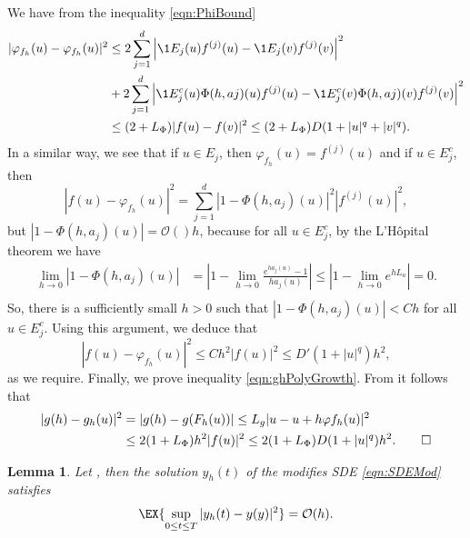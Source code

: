 \documentclass[sort&compress, preprint]{elsarticle}
\theoremstyle{definition}
\theoremstyle{plain}%
\newtheorem{lem}{Lemma}[section]
\theoremstyle{remark}
\begin{document}
\begin{pf}
	We have from the inequality \eqref{eqn:PhiBound}
	\begin{align*}
		|\varphi_{f_h}(u) - \varphi_{f_h}(u)|^2
		&\leq
			2 \sum_{j=1}^d
				\left|
					\1{E_j}(u) f^{(j)}(u)
					-\1{E_j}(v) f^{(j)}(v)
				\right|^2 \\
		&
		+
		2 \sum_{j=1}^d
			\left|
				\1{E_j^c}(u) \Phi(h,aj)(u) f^{(j)}(u)
				-\1{E_j^c}(v) \Phi(h,aj)(v) f^{(j)}(v)
%
			\right|^2 \\
		&\leq
			(2 + L_{\Phi}) |f(u) - f(v)|^2 
			\leq
				(2 + L_{\Phi}) D (1 + |u|^q +|v|^q). 
	\end{align*}
	In a similar way, we see that if $u \in E_j$, then $\varphi_{f_h}(u) = f^{(j)}(u)$ and if $u\in E_j^c$, then
	$$
		|f(u) - \varphi_{f_h}(u)|^2
		=
		\sum_{j=1}^d
			|1-\Phi(h,a_j)(u)|^2 |f^{(j)}(u)|^2,	
	$$
	but $|1-\Phi(h,a_j)(u)|=\mathcal{O}()h$, because for all $u \in E_j^c$, by the L'H\^{o}pital theorem we have
	\begin{align*}
		\lim_{h \to 0} |1-\Phi(h,a_j)(u)| 
			&= \left|
				1-\lim_{h\to 0} \frac{e^{h a_j(u)}-1}{h a_j(u)}
			\right|			
			\leq 
				\left|
					1-\lim_{h\to 0} e^{h L_a}
				\right|=0.\\			
	\end{align*}
	So, there is a sufficiently small $h>0$  such that
	$|1-\Phi(h,a_j)(u)|<C h$ for all $u\in E_j^c$.
	Using this argument, we deduce that
	$$
		|f(u) - \varphi_{f_h}(u)|^2
		\leq
		Ch^2 |f(u)|^2
		\leq D'(1+|u|^q)h^2,	
	$$
	as we require.	
	Finally, we prove inequality \eqref{eqn:ghPolyGrowth}.
	From   it follows that
	\begin{align*}
		|g(h) - g_h(u)|^2 
		&=
			|g(h) - g(F_h(u))|
		\leq
			L_g |u - u +h \varphi{f_h}(u)|^2 \\
		&\leq 
			2(1+L_{\Phi})h^2 |f(u)|^2
		\leq
			2(1+L_{\Phi}) D(1+|u|^q) h^2. 
		\qed
	\end{align*}
\end{pf}
%
\begin{lem}\label{lem:yhyOh}
	Let , then the solution $y_h(t)$ of the modifies SDE \eqref{eqn:SDEMod}
	satisfies
	\begin{equation}
		\EX{
			\sup_{0\leq t \leq T}
			|y_h(t) - y(y)|^2	
		} = \mathcal{O}(h).
	\end{equation}	
\end{lem}
\end{document}
